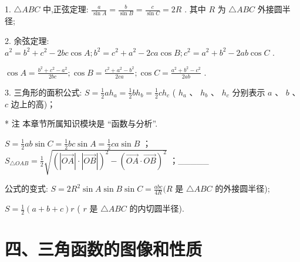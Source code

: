 1. $\bigtriangleup {ABC}$ 中,正弦定理: $\frac{a}{\sin A} = \frac{b}{\sin B} = \frac{c}{\sin C} = {2R}$ . 其中 $R$ 为 $\bigtriangleup {ABC}$ 外接圆半径;

2. 余弦定理: ${a}^{2} = {b}^{2} + {c}^{2} - {2bc}\cos A;{b}^{2} = {c}^{2} + {a}^{2} - {2ca}\cos B;{c}^{2} = {a}^{2} + {b}^{2} - {2ab}\cos C$ .

$\cos A = \frac{{b}^{2} + {c}^{2} - {a}^{2}}{2bc};\cos B = \frac{{c}^{2} + {a}^{2} - {b}^{2}}{2ca};\cos C = \frac{{a}^{2} + {b}^{2} - {c}^{2}}{2ab}$ .

3. 三角形的面积公式:   $S = \frac{1}{2}a{h}_{a} = \frac{1}{2}b{h}_{b} = \frac{1}{2}c{h}_{c}$ ( ${h}_{a}$ 、 ${h}_{b}$ 、 ${h}_{c}$ 分别表示 $a$ 、 $b$ 、 $c$ 边上的高)；

\HRule

* 注 本章节所属知识模块是 “函数与分析”.

\HRule

   $S = \frac{1}{2}{ab}\sin C = \frac{1}{2}{bc}\sin A = \frac{1}{2}{ca}\sin B$ ；   ${S}_{\bigtriangleup {OAB}} = \frac{1}{2}\sqrt{{\left( \left| \overrightarrow{OA}\right|  \cdot  \left| \overrightarrow{OB}\right| \right) }^{2} - {\left( \overrightarrow{OA} \cdot  \overrightarrow{OB}\right) }^{2}}$ ；\_\_\_\_\_

公式的变式: $S = 2{R}^{2}\sin A\sin B\sin C = \frac{abc}{4R}(R$ 是 $\bigtriangleup {ABC}$ 的外接圆半径);

$S = \frac{1}{2}\left( {a + b + c}\right) r$ ( $r$ 是 $\bigtriangleup {ABC}$ 的内切圆半径).

\section*{四、三角函数的图像和性质}

